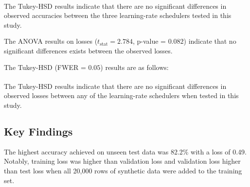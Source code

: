\noindent
{} \\


The Tukey-HSD results indicate that there are no significant differences in observed accuracies between the three learning-rate schedulers tested in this study.

The ANOVA results on losses ($t_{\text{stat}} = 2.784$, 
p-value = $0.082$) indicate that no significant differences exists between the observed losses.

The Tukey-HSD (FWER = $0.05$) results are as follows: \\

\noindent
{} \\

The Tukey-HSD results indicate that there are no significant differences in observed losses between any of the learning-rate schedulers when tested in this study.

\subsection{Key Findings}

The highest accuracy achieved on unseen test data was 82.2\% with a loss of 0.49. Notably, training loss was higher 
than validation loss and validation loss higher than test loss when all 20,000 rows of synthetic data were added to the training set.

